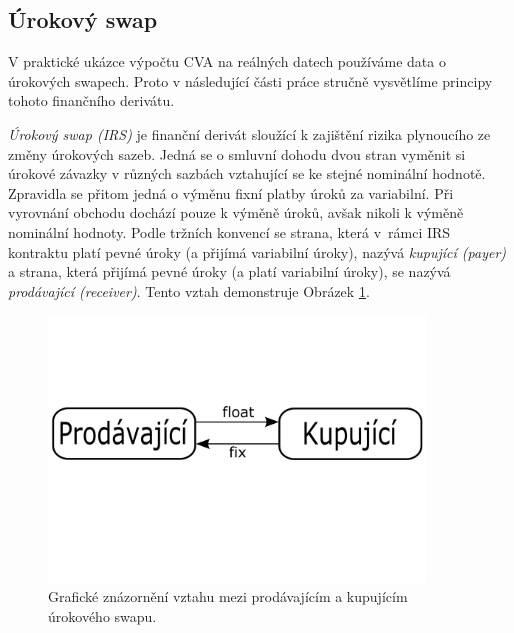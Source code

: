 \documentclass[a4paper,12pt]{report}
\theoremstyle{definition} \newtheorem{definice}[veta]{Definice}
\theoremstyle{remark}
\begin{document}
\subsection{Úrokový swap}\label{swap_kap}
V praktické ukázce výpočtu CVA na reálných datech používáme data o úrokových swapech.
Proto v následující části práce stručně vysvětlíme principy tohoto finančního derivátu.

\textit{Úrokový swap (IRS)} je finanční derivát sloužící k zajištění rizika plynoucího ze změny úrokových sazeb. 
Jedná se o smluvní dohodu dvou stran vyměnit si úrokové závazky v různých sazbách vztahující se ke stejné nominální hodnotě. 
Zpravidla se přitom jedná o výměnu fixní platby úroků za variabilní. 
Při vyrovnání obchodu dochází pouze k výměně úroků, avšak nikoli k výměně nominální hodnoty.
Podle tržních konvencí se strana, která v~rámci IRS kontraktu platí pevné úroky (a přijímá variabilní úroky), nazývá \textit{kupující (payer)} a strana, která přijímá pevné úroky (a platí variabilní úroky), se nazývá \textit{prodávající (receiver)}. 
Tento vztah demonstruje Obrázek \ref{IRS_obr}.

\begin{figure}[!htbp]
  \centering 
	\includegraphics[width=10cm, clip, trim= 0 250 0 170]{IMG/IRS2.pdf}
  \caption{Grafické znázornění vztahu mezi prodávajícím a kupujícím úrokového swapu.}  \label{IRS_obr}
\end{figure}
\end{document}
